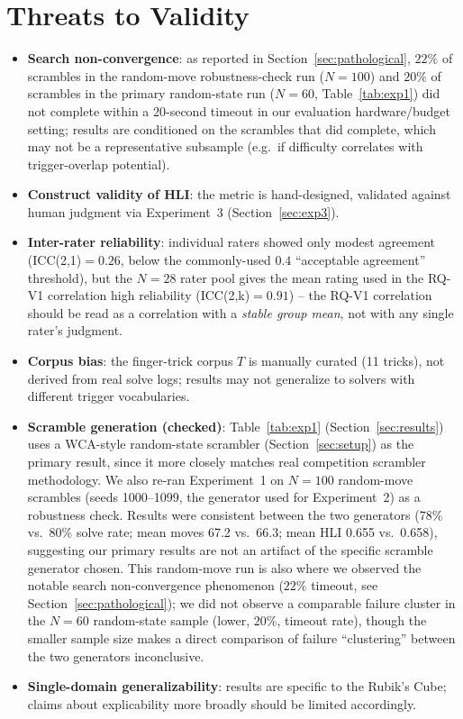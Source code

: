\documentclass[10pt,conference]{article}
\begin{document}
\section{Threats to Validity}
\label{sec:validity}
\begin{itemize}
  \item \textbf{Search non-convergence}: as reported in
    Section~\ref{sec:pathological}, $22\%$ of scrambles in the
    random-move robustness-check run ($N=100$) and $20\%$ of scrambles
    in the primary random-state run ($N=60$, Table~\ref{tab:exp1}) did
    not complete within a 20-second timeout in our evaluation
    hardware/budget setting; results are conditioned on the scrambles
    that did complete, which may not be a representative subsample
    (e.g.\ if difficulty correlates with trigger-overlap potential).
  \item \textbf{Construct validity of HLI}: the metric is
    hand-designed, validated against human judgment via
    Experiment~3 (Section~\ref{sec:exp3}).
  \item \textbf{Inter-rater reliability}: individual raters showed
    only modest agreement (ICC(2,1)$=0.26$, below the commonly-used
    $0.4$ ``acceptable agreement'' threshold), but the $N=28$ rater
    pool gives the mean rating used in the RQ-V1 correlation
    high reliability (ICC(2,k)$=0.91$) -- the RQ-V1 correlation
    should be read as a correlation with a \emph{stable group mean},
    not with any single rater's judgment.
  \item \textbf{Corpus bias}: the finger-trick corpus $T$ is
    manually curated (11 tricks), not derived from real solve logs;
    results may not generalize to solvers with different trigger
    vocabularies.
  \item \textbf{Scramble generation (checked)}: Table~\ref{tab:exp1}
    (Section~\ref{sec:results}) uses a WCA-style random-state scrambler
    (Section~\ref{sec:setup}) as the primary result, since it more
    closely matches real competition scrambler methodology. We also
    re-ran Experiment~1 on $N=100$ random-move scrambles (seeds
    1000--1099, the generator used for Experiment~2) as a robustness
    check. Results were consistent between the two generators (78\%
    vs.\ 80\% solve rate; mean moves 67.2 vs.\ 66.3; mean HLI 0.655
    vs.\ 0.658), suggesting our primary results are not an artifact of
    the specific scramble generator chosen. This random-move run is
    also where we observed the notable search non-convergence
    phenomenon ($22\%$ timeout, see Section~\ref{sec:pathological});
    we did not observe a comparable failure cluster in the $N=60$
    random-state sample (lower, $20\%$, timeout rate), though the
    smaller sample size makes a direct comparison of failure
    ``clustering'' between the two generators inconclusive.
  \item \textbf{Single-domain generalizability}: results are specific
    to the Rubik's Cube; claims about explicability more broadly
    should be limited accordingly.
\end{itemize}
\end{document}
